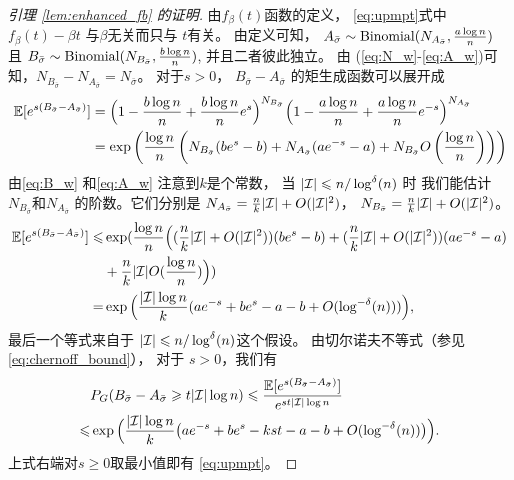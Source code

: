 \begin{proof}[引理 \ref{lem:enhanced_fb} 的证明]
  由$f_{\beta}(t)$函数的定义，
  \eqref{eq:upmpt}式中
  $f_{\beta}(t) - \beta t$ 与$\beta$无关而只与
  $t$有关。
	由定义可知，
  $A_{\bar{\sigma}}\sim \operatorname{Binomial}(N_{A_{\bar{\sigma}}},\frac{a\log n}{n})$
  且
	$B_{\bar{\sigma}}\sim\operatorname{Binomial}(N_{B_{\bar{\sigma}}},\frac{b\log n}{n})$,
  并且二者彼此独立。
  由 (\ref{eq:N_w}-\ref{eq:A_w})可知，$N_{B_{\bar{\sigma}}} - N_{A_{\bar{\sigma}}}
  = N_{\bar{\sigma}}$。
  对于$s>0$，
  $B_{\bar{\sigma}}-A_{\bar{\sigma}}$ 的矩生成函数可以展开成
	\begin{align}
	 \mathbb{E}[e^{s(B_{\bar{\sigma}}-A_{\bar{\sigma}})}] 
	& =\Big(1-\frac{b\log n}{n}+\frac{b\log n}{n} e^s \Big)^{N_{B_{\bar{\sigma}}}}
	\Big(1-\frac{a\log n}{n}+\frac{a\log n}{n} e^{-s} \Big)^{N_{A_{\bar{\sigma}}}}  \notag\\
	& = \exp\left(\frac{\log n}{n}\left(N_{B_{\bar{\sigma}}}
  (be^s - b) + N_{A_{\bar{\sigma}}}(ae^{-s}-a) + N_{B_{\bar{\sigma}}}
  O \left(\frac{\log n}{n} \right) \right) \right)
  \label{eq:exp_s_B_A_sigma}
	\end{align}
	由\eqref{eq:B_w}
  和\eqref{eq:A_w}
  注意到$k$是个常数，
  当
  $|\mathcal{I}| \leqslant n/\log^{\delta}(n)$ 时
	我们能估计
  $N_{B_{\bar{\sigma}}}$和$N_{A_{\bar{\sigma}}}$
  的阶数。它们分别是
  $N_{A_{\bar{\sigma}}} = \frac{n}{k}|\mathcal{I}| + O(|\mathcal{I}|^2)$，
	 $N_{B_{\bar{\sigma}}} = \frac{n}{k}|\mathcal{I}| + O(|\mathcal{I}|^2)$。
	\begin{align*}
	\mathbb{E}[e^{s(B_{\bar{\sigma}}-A_{\bar{\sigma}})}]
   \leqslant&
	\exp(\frac{\log n}{n}\Big((\frac{n}{k}|\mathcal{I}| + O(|\mathcal{I}|^2))(be^s - b) +(\frac{n}{k} |\mathcal{I}| + O(|\mathcal{I}|^2))(ae^{-s}-a) \\
  &+ \frac{n}{k}|\mathcal{I}|O(\frac{\log n}{n}) \Big))\\
	=
  & \exp\Big(\frac{|\mathcal{I}| \log n}{k}(a e^{-s}+b e^s-a-b +
	O(\log^{-\delta}(n))) \Big),
	\end{align*}
	最后一个等式来自于
  $ |\mathcal{I}| \leqslant n/\log^{\delta}(n)$这个假设。
	由切尔诺夫不等式（参见 \eqref{eq:chernoff_bound}），
  对于 $s>0$，我们有
	\begin{align*} 
	& P_G(B_{\bar{\sigma}}-A_{\bar{\sigma}}\geqslant t |\mathcal{I}| \log n)\leqslant
	\frac{\mathbb{E}[e^{s(B_{\bar{\sigma}}-A_{\bar{\sigma}})}]}{e^{st |\mathcal{I}|  \log n}}  \\
	\leqslant & \exp\Big(\frac{|\mathcal{I}|\log n}{k} \big(a e^{-s}+b e^s -kst -a-b
	+ O(\log^{-\delta}(n)) \big)\Big)  .
	\end{align*}
	上式右端对$s\geq 0$取最小值即有
  \eqref{eq:upmpt}。  
	\end{proof}

